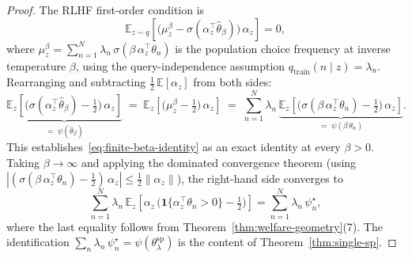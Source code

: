 \begin{proof}
    The RLHF first-order condition is
    \begin{equation}
        \mathbb{E}_{z \sim q}\!\left[
            \bigl(\mu_z^\beta 
            - \sigma(\alpha_z^\top \hat{\theta}_\beta)\bigr)
            \,\alpha_z
        \right] = 0,
    \end{equation}
    where $\mu_z^\beta 
    = \sum_{n=1}^N \lambda_n\,\sigma(\beta\,\alpha_z^\top\theta_n)$ 
    is the population choice frequency at inverse temperature $\beta$, 
    using the query-independence assumption 
    $q_{\mathrm{train}}(n \mid z) = \lambda_n$. 
    Rearranging and subtracting 
    $\frac{1}{2}\,\mathbb{E}[\alpha_z]$ from both sides:
    \begin{equation}
        \underbrace{
            \mathbb{E}_{z}\!\left[
                \bigl(\sigma(\alpha_z^\top \hat{\theta}_\beta) 
                - \tfrac{1}{2}\bigr)\,\alpha_z
            \right]
        }_{=\;\psi(\hat{\theta}_\beta)}
        \;=\;
        \mathbb{E}_{z}\!\left[
            \bigl(\mu_z^\beta - \tfrac{1}{2}\bigr)\,\alpha_z
        \right]
        \;=\;
        \sum_{n=1}^N \lambda_n\,
        \underbrace{
            \mathbb{E}_{z}\!\left[
                \bigl(\sigma(\beta\,\alpha_z^\top\theta_n) 
                - \tfrac{1}{2}\bigr)\,\alpha_z
            \right]
        }_{=\;\psi(\beta\,\theta_n)}.
    \end{equation}
    This establishes~\eqref{eq:finite-beta-identity} as an exact 
    identity at every $\beta > 0$. Taking $\beta \to \infty$ and 
    applying the dominated convergence theorem 
    (using $|(\sigma(\beta\,\alpha_z^\top\theta_n) 
    - \frac{1}{2})\,\alpha_z| 
    \leq \frac{1}{2}\|\alpha_z\|$), the right-hand side converges to
    \begin{equation}
        \sum_{n=1}^N \lambda_n \, 
        \mathbb{E}_{z}\!\left[
            \alpha_z\,
            \bigl(\mathbf{1}\{\alpha_z^\top\theta_n > 0\} 
            - \tfrac{1}{2}\bigr)
        \right]
        = \sum_{n=1}^N \lambda_n\,\psi_n^\star,
    \end{equation}
    where the last equality follows from 
    Theorem~\ref{thm:welfare-geometry}(7). The identification 
    $\sum_n \lambda_n\,\psi_n^\star 
    = \psi(\theta_\lambda^{\mathrm{sp}})$ is the content of 
    Theorem~\ref{thm:single-sp}.
\end{proof}

